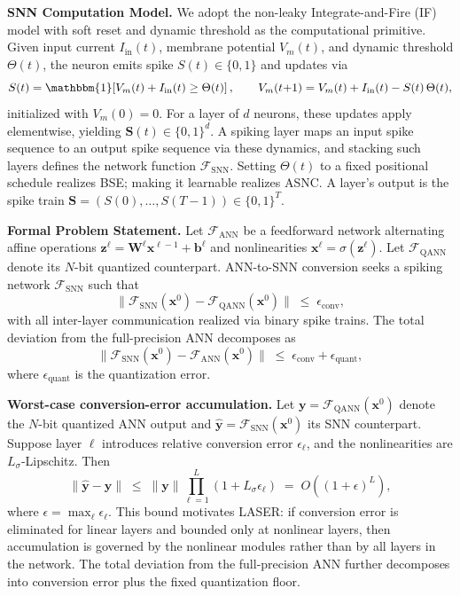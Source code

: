 \documentclass{article}
\theoremstyle{plain}
\theoremstyle{definition}
\theoremstyle{remark}
\begin{document}
\noindent\textbf{SNN Computation Model.}
We adopt the non-leaky Integrate-and-Fire (IF) model with soft reset and dynamic
threshold as the computational primitive. Given input current $I_{\mathrm{in}}(t)$,
membrane potential $V_m(t)$, and dynamic threshold $\Theta(t)$, the neuron emits
spike $S(t) \in \{0,1\}$ and updates via
\begin{equation}
\label{eq:if_forward}
S(t) = \mathbbm{1}\!\left[V_m(t) + I_{\mathrm{in}}(t) \ge \Theta(t)\right], \qquad
V_m(t{+}1) = V_m(t) + I_{\mathrm{in}}(t) - S(t)\,\Theta(t),
\end{equation}
initialized with $V_m(0) = 0$. 
For a layer of $d$ neurons, these updates apply elementwise, yielding
$\mathbf{S}(t) \in \{0,1\}^d$. A spiking layer maps an input spike
sequence to an output spike sequence via these dynamics, and stacking
such layers defines the network function $\mathcal{F}_{\mathrm{SNN}}$.
%
Setting $\Theta(t)$ to a fixed positional schedule
realizes BSE; making it learnable realizes ASNC. A layer's output is the spike
train $\mathbf{S} = (S(0), \dots, S(T-1)) \in \{0,1\}^T$.

\noindent\textbf{Formal Problem Statement.}
Let $\mathcal{F}_{\mathrm{ANN}}$ be a feedforward network alternating affine
operations $\mathbf{z}^\ell = \mathbf{W}^\ell \mathbf{x}^{\ell-1} + \mathbf{b}^\ell$
and nonlinearities $\mathbf{x}^\ell = \sigma(\mathbf{z}^\ell)$.
%
Let $\mathcal{F}_{\mathrm{QANN}}$ denote its $N$-bit quantized counterpart.
ANN-to-SNN conversion seeks a spiking network $\mathcal{F}_{\mathrm{SNN}}$
such that
\begin{equation}
\label{eq:conversion_goal}
\bigl\|\mathcal{F}_{\mathrm{SNN}}(\mathbf{x}^0)
      - \mathcal{F}_{\mathrm{QANN}}(\mathbf{x}^0)\bigr\|
\;\le\; \epsilon_{\mathrm{conv}},
\end{equation}
with all inter-layer communication realized via binary spike trains.
%
The total deviation from the full-precision ANN decomposes as
\[
\|\mathcal{F}_{\mathrm{SNN}}(\mathbf{x}^0)
- \mathcal{F}_{\mathrm{ANN}}(\mathbf{x}^0)\|
\;\le\;
\epsilon_{\mathrm{conv}} + \epsilon_{\mathrm{quant}},
\]
where $\epsilon_{\mathrm{quant}}$ is the quantization error.

\noindent\textbf{Worst-case conversion-error accumulation.}
Let $\mathbf{y}=\mathcal{F}_{\mathrm{QANN}}(\mathbf{x}^0)$ denote the
$N$-bit quantized ANN output and
$\hat{\mathbf{y}}=\mathcal{F}_{\mathrm{SNN}}(\mathbf{x}^0)$ its SNN counterpart.
Suppose layer $\ell$ introduces relative conversion error $\epsilon_\ell$, and
the nonlinearities are $L_\sigma$-Lipschitz. Then
\begin{equation}
\label{eq:error_accumulation}
\|\hat{\mathbf{y}}-\mathbf{y}\|
\;\le\;
\|\mathbf{y}\|\prod_{\ell=1}^{L}(1+L_\sigma\epsilon_\ell)
\;=\;
O\!\left((1+\epsilon)^L\right),
\end{equation}
where $\epsilon=\max_\ell \epsilon_\ell$.
This bound motivates LASER: if conversion error is eliminated for linear
layers and bounded only at nonlinear layers, then accumulation is governed
by the nonlinear modules rather than by all layers in the network. The total deviation from the full-precision ANN further decomposes into conversion error plus the fixed quantization floor.
\end{document}
